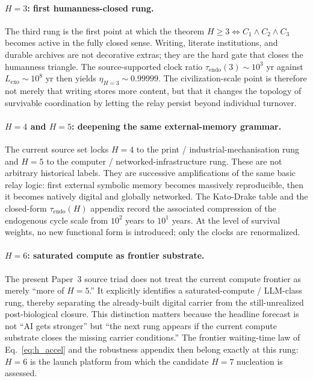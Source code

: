 \documentclass[11pt]{article}
\begin{document}
\paragraph{$H{=}3$: first humanness-closed rung.}
The third rung is the first point at which the theorem
$H\ge 3 \Leftrightarrow C_1\wedge C_2\wedge C_3$
becomes active in the fully closed sense.
Writing,
literate institutions,
and durable archives are not decorative extras;
they are the hard gate that closes the humanness triangle.
The source-supported clock ratio
$\tau_{\mathrm{endo}}(3)\sim 10^{3}$ yr
against
$L_{\mathrm{exo}}\sim 10^{8}$ yr
then yields
$\eta_{H=3}\sim 0.99999$.
The civilization-scale point is therefore not merely that writing stores more
content,
but that it changes the topology of survivable coordination by letting the
relay persist beyond individual turnover.

\paragraph{$H{=}4$ and $H{=}5$: deepening the same external-memory grammar.}
The current source set locks
$H{=}4$ to the print / industrial-mechanisation rung and
$H{=}5$ to the computer / networked-infrastructure rung.
These are not arbitrary historical labels.
They are successive amplifications of the same basic relay logic:
first external symbolic memory becomes massively reproducible,
then it becomes natively digital and globally networked.
The Kato-Drake table and the closed-form $\tau_{\mathrm{endo}}(H)$ appendix
record the associated compression of the endogenous cycle scale from
$10^{2}$ years to
$10^{1}$ years.
At the level of survival weights,
no new functional form is introduced;
only the clocks are renormalized.

\paragraph{$H{=}6$: saturated compute as frontier substrate.}
The present Paper~3 source triad does not treat the current compute frontier as
merely ``more of $H{=}5$.''
It explicitly identifies a saturated-compute / LLM-class rung,
thereby separating the already-built digital carrier from the still-unrealized
post-biological closure.
This distinction matters because the headline forecast is not
``AI gets stronger''
but
``the next rung appears if the current compute substrate closes the missing
carrier conditions.''
The frontier waiting-time law of Eq.~\eqref{eq:h_accel} and the robustness
appendix then belong exactly at this rung:
$H{=}6$ is the launch platform from which the candidate
$H{=}7$ nucleation is assessed.
\end{document}
